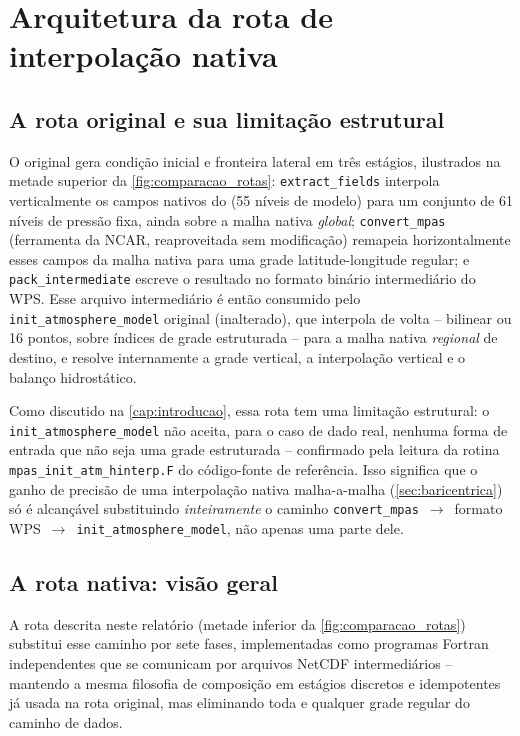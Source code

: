 \chapter{Arquitetura da rota de interpolação nativa}
\label{cap:arquitetura}

\section{A rota original e sua limitação estrutural}
\label{sec:rota_original}

O \selfgrib{} original gera condição inicial e fronteira lateral em três
estágios, ilustrados na metade superior da \cref{fig:comparacao_rotas}:
\texttt{extract\_fields} interpola verticalmente os campos nativos do
\mpasa{} (55 níveis de modelo) para um conjunto de 61 níveis de pressão
fixa, ainda sobre a malha nativa \emph{global}; \texttt{convert\_mpas}
(ferramenta da NCAR, reaproveitada sem modificação) remapeia
horizontalmente esses campos da malha nativa para uma grade
latitude-longitude regular; e \texttt{pack\_intermediate} escreve o
resultado no formato binário intermediário do WPS. Esse arquivo
intermediário é então consumido pelo \texttt{init\_atmosphere\_model}
original (inalterado), que interpola de volta -- bilinear ou 16 pontos,
sobre índices de grade estruturada -- para a malha nativa \emph{regional}
de destino, e resolve internamente a grade vertical, a interpolação
vertical e o balanço hidrostático.

Como discutido na \cref{cap:introducao}, essa rota tem uma limitação
estrutural: o \texttt{init\_atmosphere\_model} não aceita, para o caso de
dado real, nenhuma forma de entrada que não seja uma grade estruturada
-- confirmado pela leitura da rotina \texttt{mpas\_init\_atm\_hinterp.F}
do código-fonte de referência. Isso significa que o ganho de precisão de
uma interpolação nativa malha-a-malha (\cref{sec:baricentrica}) só é
alcançável substituindo \emph{inteiramente} o caminho
\texttt{convert\_mpas}~$\to$~formato WPS~$\to$~\texttt{init\_atmosphere\_model},
não apenas uma parte dele.

\section{A rota nativa: visão geral}
\label{sec:rota_nativa}

A rota descrita neste relatório (metade inferior da
\cref{fig:comparacao_rotas}) substitui esse caminho por sete fases,
implementadas como programas Fortran independentes que se comunicam por
arquivos NetCDF intermediários -- mantendo a mesma filosofia de
composição em estágios discretos e idempotentes já usada na rota
original, mas eliminando toda e qualquer grade regular do caminho de
dados.

